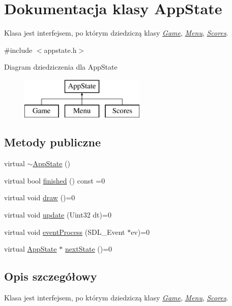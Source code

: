\hypertarget{class_app_state}{}\section{Dokumentacja klasy App\+State}
\label{class_app_state}


Klasa jest interfejsem, po którym dziedziczą klasy {\itshape \hyperlink{class_game}{Game}}, {\itshape \hyperlink{class_menu}{Menu}}, {\itshape \hyperlink{class_scores}{Scores}}.  




{\ttfamily \#include $<$appstate.\+h$>$}

Diagram dziedziczenia dla App\+State\begin{figure}[H]
\begin{center}
\leavevmode
\includegraphics[height=2.000000cm]{class_app_state}
\end{center}
\end{figure}
\subsection*{Metody publiczne}
\begin{DoxyCompactItemize}
\item 
virtual \hyperlink{class_app_state_adef088013ce73c6c667f20a019b02d69}{$\sim$\+App\+State} ()
\item 
virtual bool \hyperlink{class_app_state_ad377464581817ae4000b9cd6c47dc4e8}{finished} () const =0
\item 
virtual void \hyperlink{class_app_state_ad2a668dc35b06c330a788e82d9eebee2}{draw} ()=0
\item 
virtual void \hyperlink{class_app_state_a28660de31b5a7a36691b67866f82e5f2}{update} (Uint32 dt)=0
\item 
virtual void \hyperlink{class_app_state_a9cd9175e5cd251bea2e7eeb4ee9f6137}{event\+Process} (S\+D\+L\+\_\+\+Event $\ast$ev)=0
\item 
virtual \hyperlink{class_app_state}{App\+State} $\ast$ \hyperlink{class_app_state_afafba64bbaaf7552f6e0632821c2338f}{next\+State} ()=0
\end{DoxyCompactItemize}


\subsection{Opis szczegółowy}
Klasa jest interfejsem, po którym dziedziczą klasy {\itshape \hyperlink{class_game}{Game}}, {\itshape \hyperlink{class_menu}{Menu}}, {\itshape \hyperlink{class_scores}{Scores}}. 

